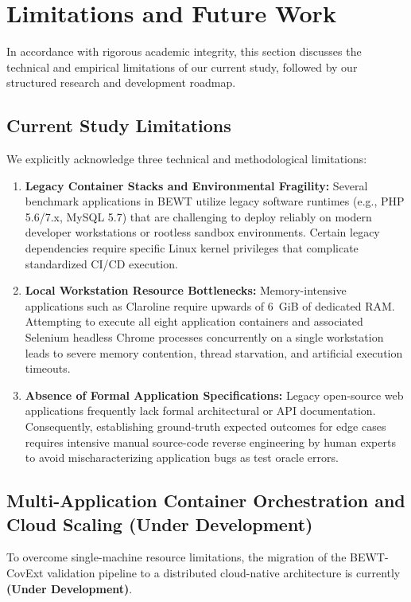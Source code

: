\documentclass[pdflatex,sn-mathphys-num]{sn-jnl}
\begin{document}
\section{Limitations and Future Work}\label{sec:limitations}

In accordance with rigorous academic integrity, this section discusses the technical and empirical limitations of our current study, followed by our structured research and development roadmap.

\subsection{Current Study Limitations}

We explicitly acknowledge three technical and methodological limitations:
\begin{enumerate}
    \item \textbf{Legacy Container Stacks and Environmental Fragility:} Several benchmark applications in BEWT utilize legacy software runtimes (e.g., PHP 5.6/7.x, MySQL 5.7) that are challenging to deploy reliably on modern developer workstations or rootless sandbox environments. Certain legacy dependencies require specific Linux kernel privileges that complicate standardized CI/CD execution.
    \item \textbf{Local Workstation Resource Bottlenecks:} Memory-intensive applications such as Claroline require upwards of 6~GiB of dedicated RAM. Attempting to execute all eight application containers and associated Selenium headless Chrome processes concurrently on a single workstation leads to severe memory contention, thread starvation, and artificial execution timeouts.
    \item \textbf{Absence of Formal Application Specifications:} Legacy open-source web applications frequently lack formal architectural or API documentation. Consequently, establishing ground-truth expected outcomes for edge cases requires intensive manual source-code reverse engineering by human experts to avoid mischaracterizing application bugs as test oracle errors.
\end{enumerate}

\subsection{Multi-Application Container Orchestration and Cloud Scaling (Under Development)}\label{subsec:multi-app-cloud-dev}

To overcome single-machine resource limitations, the migration of the BEWT-CovExt validation pipeline to a distributed cloud-native architecture is currently \textbf{(Under Development)}. 
\end{document}
